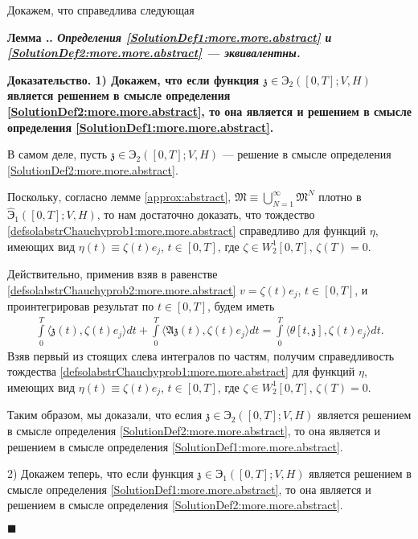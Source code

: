 \documentclass{report}
\newcounter{lem}[section]
\renewcommand{\thelem}{\thesection.\arabic{lem}}
\newenvironment{Lemma}{\par\refstepcounter{lem}\bf Лемма \thelem. \it}{\rm\par}
\newenvironment{Proof}{\par\noindent\bf Доказательство.\rm}{ $\blacksquare$\par}
\begin{document}
Докажем, что справедлива следующая
\begin{Lemma}\label{SolutionDefsEquivalence:more.more.abstract}
Определения \ref{SolutionDef1:more.more.abstract} и \ref{SolutionDef2:more.more.abstract} --- эквивалентны.
\end{Lemma}
\begin{Proof}
1) Докажем, что если функция  ${\mathfrak{z}}\in{\textbf{Э}}_2([0,T];V,H)$ является решением в смысле определения \ref{SolutionDef2:more.more.abstract}, то она является и решением в смысле
определения \ref{SolutionDef1:more.more.abstract}.

В самом деле, пусть  ${\mathfrak{z}}\in{\textbf{Э}}_2([0,T];V,H)$ --- решение в смысле определения \ref{SolutionDef2:more.more.abstract}.

Поскольку, согласно лемме \ref{approx:abstract}, ${\mathfrak{M}}\equiv \bigcup\limits_{N=1}^\infty{\mathfrak{M}}^N$ плотно в $\hat{\textbf{Э}}{}_1([0,T];V,H)$, то нам достаточно
доказать, что тождество \eqref{defsolabstrChauchyprob1:more.more.abstract} справедливо для функций $\eta$, имеющих вид $\eta(t)\equiv\zeta(t)e_j$, $t\in[0,T]$, где $\zeta\in W^1_2[0,T]$,
$\zeta(T)=0$.

Действительно, применив взяв в равенстве \eqref{defsolabstrChauchyprob2:more.more.abstract} $v=\zeta(t)e_j$, $t\in[0,T]$, и проинтегрировав результат по $t\in[0,T]$, будем иметь
\begin{gather*}
\int\limits_0^T\langle\ddot{\mathfrak{z}}(t),\zeta(t)e_j\rangle dt+\int\limits_0^T\langle\mathfrak{A}{\mathfrak{z}}(t), \zeta(t)e_j\rangle dt=
\int\limits_0^T\langle \theta[t,{\mathfrak{z}}], \zeta(t)e_j\rangle dt.
\end{gather*}
Взяв первый из стоящих слева интегралов по частям, получим справедливость тождества \eqref{defsolabstrChauchyprob1:more.more.abstract} для функций $\eta$, имеющих вид
$\eta(t)\equiv\zeta(t)e_j$, $t\in[0,T]$, где $\zeta\in W^1_2[0,T]$, $\zeta(T)=0$.

Таким образом, мы доказали, что еслия  ${\mathfrak{z}}\in{\textbf{Э}}_2([0,T];V,H)$ является решением в смысле определения \ref{SolutionDef2:more.more.abstract}, то она является и решением
в смысле определения \ref{SolutionDef1:more.more.abstract}.

2) Докажем теперь, что если функция  ${\mathfrak{z}}\in{\textbf{Э}}_1([0,T];V,H)$ является решением в смысле определения \ref{SolutionDef1:more.more.abstract}, то она является и решением в
смысле определения \ref{SolutionDef2:more.more.abstract}.


\end{Proof}
\end{document}
